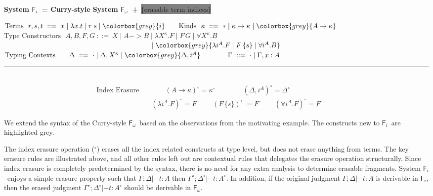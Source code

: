 \documentclass{article}
\newcommand{\Fi}{\ensuremath{\mathsf{F}_i}}
\newcommand{\Fw}{\ensuremath{\mathsf{F}_\omega}}
\newcommand{\newFi}[1]{\colorbox{grey}{\ensuremath{#1}}}
\begin{document}
\begin{center}
\textbf{
 System \Fi ~= Curry-style System \Fw\ + \newFi{\text{\{erasable term indices\}}}}
 \vspace*{-7pt}
\end{center}
\begin{framed}\vspace{-6pt}\noindent
$
\text{Terms}~~ r,s,t ~ ::= ~ x \mid \lambda x.t \mid r\;s \mid \newFi{i}
\qquad
\text{Kinds}~~ \kappa ~ ::= ~ *
                                \mid \kappa -> \kappa
                                \mid \newFi{A -> \kappa}$ \vspace*{2pt} \\
$
\text{Type Constructors}~~~
        A,B,F,G               ~ ::= ~ X
                                \mid A -> B
                                \mid \lambda X^\kappa.F
                                \mid F\,G
                                \mid \forall X^\kappa . B$\\
$~\qquad\qquad\qquad\qquad\qquad\qquad\qquad\qquad\qquad\qquad\quad
\mid \newFi{\lambda i^A.F
                                \mid F\,\{s\}
                                \mid \forall i^A . B}$ \\
$\text{Typing Contexts}
\qquad \Delta                ~ ::= ~ \cdot
                                \mid \Delta, X^\kappa
                                \mid \newFi{\Delta, i^A}
\qquad\qquad \Gamma                ~ ::= ~ \cdot
                                \mid \Gamma, x : A 
$\vspace*{3pt}
\hrule ~ \\ \vspace*{-20pt}
\begin{align*}
 \!\!\!\!\!\!\!\!\text{Index Erasure}\quad
& \qquad (A\to\kappa)^{\circ}=\kappa^{\circ} \qquad \qquad
(\Delta,i^A)^\circ = \Delta^\circ
\\
& (\lambda i^{A}.F)^{\circ}=F^{\circ} \qquad
(F\,\{s\})^{\circ}\;=F^{\circ} \qquad
(\forall i^{A}.F)^{\circ}=F^{\circ} \qquad
\end{align*}\vspace*{-25pt}
\end{framed}\vspace*{-5pt}
We extend the syntax of the Curry-style \Fw\ based on the observations from
the motivating example. The constructs new to \Fi\ are highlighted grey.

The index erasure operation ($^\circ$) erases all the index related constructs
at type level, but does not erase anything from terms. The key erasure rules are
illustrated above, and all other rules left out are contextual rules that
delegates the erasure operation structurally. Since index erasure is completely
predetermined by the syntax, there is no need for any extra analysis
to determine erasable fragments. System \Fi\ enjoys a simple erasure property
such that $\Gamma;\Delta|- t:A$ then $\Gamma^\circ;\Delta^\circ|- t:A^\circ$.
In addition, if the original judgment $\Gamma;\Delta|- t:A$ is derivable in \Fi,
then the erased judgment $\Gamma^\circ;\Delta^\circ|- t:A^\circ$ should be
derivable in \Fw.
\end{document}
